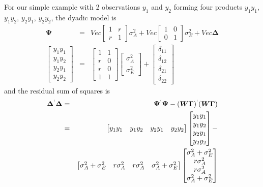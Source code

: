 \documentclass[titlepage]{article}  %
\begin{document}
For our simple example with 2 observations $y_{1}$ and $y_{2}$ forming four products $y_{1}y_{1}$, $y_{1}y_{2}$, $y_{2}y_{1}$, $y_{2}y_{2}$, the dyadic model is 
\begin{eqnarray*}
\bm{\Psi} & = &  Vec \begin{bmatrix} 1 & r \\ r & 1 \end{bmatrix} \sigma^{2}_{A}
         + Vec \begin{bmatrix} 1 & 0 \\ 0 & 1 \end{bmatrix} \sigma^{2}_{E} 
         + Vec \bm{\Delta} \\
 \begin{bmatrix} y_{1}y_{1} \\ y_{1}y_{2} \\ y_{2}y_{1} \\ y_{2}y_{2} \end{bmatrix}          & = & \begin{bmatrix} 1 & 1 \\ r & 0 \\ r & 0 \\ 1 & 1 \end{bmatrix} \begin{bmatrix} \sigma^{2}_{A} \\ \sigma^{2}_{E} \end{bmatrix} +  
  \begin{bmatrix} \delta_{11} \\ \delta_{12} \\ \delta_{21} \\ \delta_{22} \end{bmatrix}
\end{eqnarray*}
 and the residual sum of squares is 
\begin{eqnarray*}
\bm{\Delta}^{`} \bm{\Delta} & = &  \bm{\Psi}^{`}\bm{\Psi} - (\bm{W}\bm{\Gamma})^{`} (\bm{W}\bm{\Gamma}) \\
 & = & \begin{bmatrix} y_{1}y_{1} & y_{1}y_{2} & y_{2}y_{1} & y_{2}y_{2} \end{bmatrix} \begin{bmatrix} y_{1}y_{1} \\ y_{1}y_{2} \\ y_{2}y_{1} \\ y_{2}y_{2} \end{bmatrix} - \\ & &  \begin{bmatrix} \sigma^{2}_{A} + \sigma^{2}_{E} & r \sigma^{2}_{A} & r \sigma^{2}_{A} & \sigma^{2}_{A} + \sigma^{2}_{E} \end{bmatrix}
\begin{bmatrix}\sigma^{2}_{A} + \sigma^{2}_{E} \\ r \sigma^{2}_{A} \\ r \sigma^{2}_{A} \\ \sigma^{2}_{A} + \sigma^{2}_{E} \end{bmatrix} \\
\end{eqnarray*}
\end{document}
